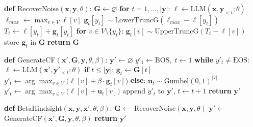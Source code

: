 \begin{algorithm*}
\caption{Expanded $\beta$-Hindsight Control Algorithm with Comments}
\label{alg:gumbel-cf-long}
\begin{algorithmic}[1]

\STATE \textbf{def} RecoverNoise$(\mathbf x, \mathbf y, \theta)$:
\STATE \quad $\mathbf G \gets \varnothing$
\STATE \quad \textbf{for} $t = 1,\dots,|\mathbf y|$:
\STATE \qquad $\ell \gets \mathrm{LLM}(\mathbf x, \mathbf y_{<t};\theta)$ 
\STATE \qquad $\ell_{max} \gets \max_{v\in V} \ell[v]$ 
\STATE \qquad $\mathbf g_t[y_t] \sim \mathrm{LowerTruncG}(\ell_{max} - \ell[y_t])$
\STATE \qquad $T_t \gets \ell[y_t] + \mathbf g_t[y_t]$ 
\STATE \qquad \textbf{for} $v \in V \setminus \{y_t\}$:
\STATE \qquad\quad $\mathbf g_t[v] \sim \mathrm{UpperTruncG}(T_t - \ell[v])$
\STATE \qquad store $\mathbf g_t$ in $\mathbf G$
\STATE \quad \textbf{return} $\mathbf G$
\vspace{6pt}

\STATE \textbf{def} GenerateCF$(\mathbf x', \mathbf G, \mathbf y, \theta, \beta)$:
\STATE \quad $\mathbf y' \gets \varnothing$
\STATE \quad $y'_1 \gets \mathrm{BOS},\; t \gets 1$
\STATE \quad \textbf{while} $y'_t \neq \mathrm{EOS}$:
\STATE \qquad $\ell \gets \mathrm{LLM}(\mathbf x', \mathbf y'_{<t}; \theta)$
\STATE \qquad \textbf{if} $t \le |\mathbf y|$:
\STATE \qquad\quad $\mathbf g_t \gets \mathbf G[t]$ 
\STATE \qquad\quad $y'_t \gets \arg\max_{v\in V}\bigl(\ell[v] + \beta \cdot \mathbf g_t[v]\bigr)$
\STATE \qquad \textbf{else}:
\STATE \qquad\quad $\mathbf u_t \sim \mathrm{Gumbel}(0,1)^{|V|}$
\STATE \qquad\quad $y'_t \gets \arg\max_{v\in V}\bigl(\ell[v] + \mathbf u_t[v]\bigr)$
\STATE \qquad append $y'_t$ to $\mathbf y'$, $t \gets t+1$
\STATE \quad \textbf{return} $\mathbf y'$
\vspace{6pt}

\STATE \textbf{def} BetaHindsight$(\mathbf x, \mathbf y, \mathbf x', \theta, \beta)$:
\STATE \quad $\mathbf G \gets$ RecoverNoise$(\mathbf x, \mathbf y, \theta)$
\STATE \quad $\mathbf y' \gets$ GenerateCF$(\mathbf x', \mathbf G, \mathbf y, \theta, \beta)$
\STATE \quad \textbf{return} $\mathbf y'$

\end{algorithmic}
\end{algorithm*}